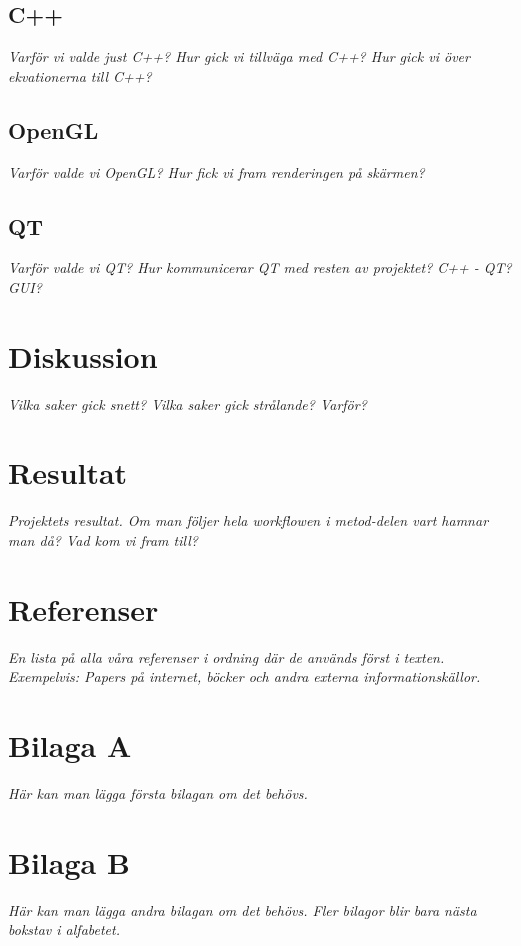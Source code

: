 \documentclass[a4paper,12pt,twoside,swedish]{report}
\begin{document}
\subsection{C++}
\textit{Varför vi valde just C++? Hur gick vi tillväga med C++? Hur gick vi över ekvationerna till C++?}

\subsection{OpenGL}
\textit{Varför valde vi OpenGL? Hur fick vi fram renderingen på skärmen?}

\subsection{QT}
\textit{Varför valde vi QT? Hur kommunicerar QT med resten av projektet? C++ - QT? GUI?}

\section{Diskussion}
\textit{Vilka saker gick snett? Vilka saker gick strålande? Varför?}

\section{Resultat}
\textit{Projektets resultat. Om man följer hela workflowen i metod-delen vart hamnar man då? Vad kom vi fram till?}

\section{Referenser}
\textit{En lista på alla våra referenser i ordning där de används först i texten. Exempelvis: Papers på internet, böcker och andra externa informationskällor.}

\section{Bilaga A}
\textit{Här kan man lägga första bilagan om det behövs.}

\section{Bilaga B}
\textit{Här kan man lägga andra bilagan om det behövs. Fler bilagor blir bara nästa bokstav i alfabetet.}
\end{document}
